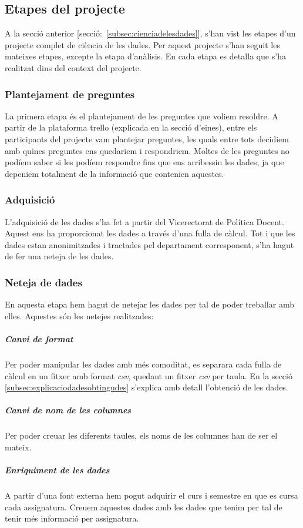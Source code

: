 \documentclass[12pt,a4paper,catalan]{article}
\begin{document}
\subsection{Etapes del projecte}
A la secció anterior [secció:~\ref{subsec:cienciadelesdades}], s'han vist les etapes d'un projecte complet de ciència de les dades. Per aquest projecte s'han seguit les mateixes etapes, excepte la etapa d'anàlisis. En cada etapa es detalla que s'ha realitzat dins del context del projecte.

\subsubsection{Plantejament de preguntes}
La primera etapa és el plantejament de les preguntes que voliem resoldre. A partir de la plataforma trello (explicada en la secció d'eines), entre els participants del projecte vam plantejar preguntes, les quals entre tots decidiem amb quines preguntes ens quedariem i respondriem. Moltes de les preguntes no podíem saber si les podíem respondre fins que ens arribessin les dades, ja que depeniem totalment de la informació que contenien aquestes.

\subsubsection{Adquisició}
L'adquisició de les dades s'ha fet a partir del Vicerectorat de Política Docent. Aquest ens ha proporcionat les dades a través d'una fulla de càlcul. Tot i que les dades estan anonimitzades i tractades pel departament corresponent, s'ha hagut de fer una neteja de les dades.

\subsubsection{Neteja de dades}
En aquesta etapa hem hagut de netejar les dades per tal de poder treballar amb elles. Aquestes són les netejes realitzades:

\subparagraph{Canvi de format}
Per poder manipular les dades amb més comoditat, es separara cada fulla de càlcul en un fitxer amb format \textit{csv}, quedant un fitxer \textit{csv} per taula. En la secció \ref{subsec:explicaciodadesobtingudes} s'explica amb detall l'obtenció de les dades.

\subparagraph{Canvi de nom de les columnes}
Per poder creuar les diferents taules, els noms de les columnes han de ser el mateix.

\subparagraph{Enriquiment de les dades}
A partir d'una font externa hem pogut adquirir el curs i semestre en que es cursa cada assignatura. Creuem aquestes dades amb les dades que tenim per tal de tenir més informació per assignatura.
\end{document}
